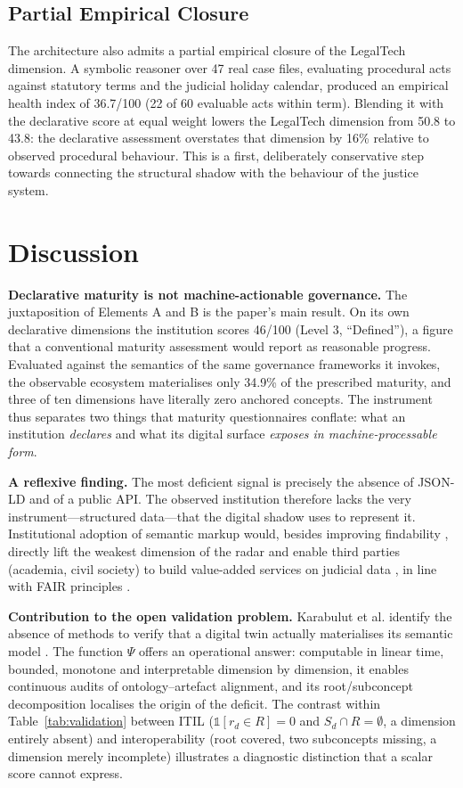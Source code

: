 \documentclass[engproc,article,submit,moreauthors]{Definitions/mdpi}
\begin{document}
\subsection{Partial Empirical Closure}
The architecture also admits a partial empirical closure of the LegalTech dimension. A symbolic reasoner over 47 real case files, evaluating procedural acts against statutory terms and the judicial holiday calendar, produced an empirical health index of 36.7/100 (22 of 60 evaluable acts within term). Blending it with the declarative score at equal weight lowers the LegalTech dimension from 50.8 to 43.8: the declarative assessment overstates that dimension by 16\% relative to observed procedural behaviour. This is a first, deliberately conservative step towards connecting the structural shadow with the behaviour of the justice system.

\section{Discussion}
\label{sec:discussion}

\textbf{Declarative maturity is not machine-actionable governance.} The juxtaposition of Elements A and B is the paper's main result. On its own declarative dimensions the institution scores 46/100 (Level 3, ``Defined''), a figure that a conventional maturity assessment would report as reasonable progress. Evaluated against the semantics of the same governance frameworks it invokes, the observable ecosystem materialises only 34.9\% of the prescribed maturity, and three of ten dimensions have literally zero anchored concepts. The instrument thus separates two things that maturity questionnaires conflate: what an institution \emph{declares} and what its digital surface \emph{exposes in machine-processable form}.

\textbf{A reflexive finding.} The most deficient signal is precisely the absence of JSON-LD and of a public API. The observed institution therefore lacks the very instrument---structured data---that the digital shadow uses to represent it. Institutional adoption of semantic markup would, besides improving findability \cite{Guha2016}, directly lift the weakest dimension of the radar and enable third parties (academia, civil society) to build value-added services on judicial data \cite{Attard2015}, in line with FAIR principles \cite{Wilkinson2016}.

\textbf{Contribution to the open validation problem.} Karabulut et al. identify the absence of methods to verify that a digital twin actually materialises its semantic model \cite{Karabulut2024}. The function $\Psi$ offers an operational answer: computable in linear time, bounded, monotone and interpretable dimension by dimension, it enables continuous audits of ontology--artefact alignment, and its root/subconcept decomposition localises the origin of the deficit. The contrast within Table~\ref{tab:validation} between ITIL ($\mathbb{1}[r_d \in R]=0$ and $S_d \cap R = \emptyset$, a dimension entirely absent) and interoperability (root covered, two subconcepts missing, a dimension merely incomplete) illustrates a diagnostic distinction that a scalar score cannot express.
\end{document}
